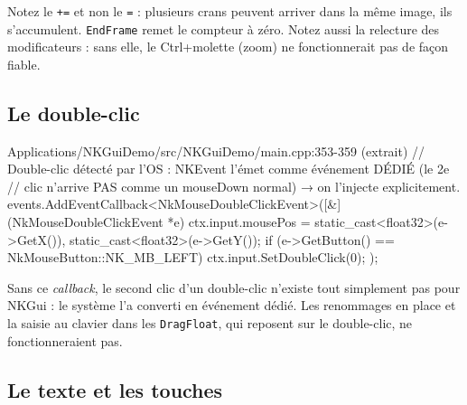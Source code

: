 Notez le \texttt{+=} et non le \texttt{=} : plusieurs crans peuvent arriver dans
la même image, ils s'accumulent. \texttt{EndFrame} remet le compteur à zéro.
Notez aussi la relecture des modificateurs : sans elle, le Ctrl+molette (zoom)
ne fonctionnerait pas de façon fiable.

\subsection{Le double-clic}

\begin{nkcode}{Applications/NKGuiDemo/src/NKGuiDemo/main.cpp:353-359 (extrait)}
    // Double-clic détecté par l'OS : NKEvent l'émet comme événement DÉDIÉ (le 2e
    // clic n'arrive PAS comme un mouseDown normal) → on l'injecte explicitement.
    events.AddEventCallback<NkMouseDoubleClickEvent>([&](NkMouseDoubleClickEvent *e) {
        ctx.input.mousePos = {static_cast<float32>(e->GetX()), static_cast<float32>(e->GetY())};
        if (e->GetButton() == NkMouseButton::NK_MB_LEFT) ctx.input.SetDoubleClick(0);
    });
\end{nkcode}

Sans ce \emph{callback}, le second clic d'un double-clic n'existe tout simplement
pas pour NKGui : le système l'a converti en événement dédié. Les renommages en
place et la saisie au clavier dans les \texttt{DragFloat}, qui reposent sur le
double-clic, ne fonctionneraient pas.

\subsection{Le texte et les touches}

